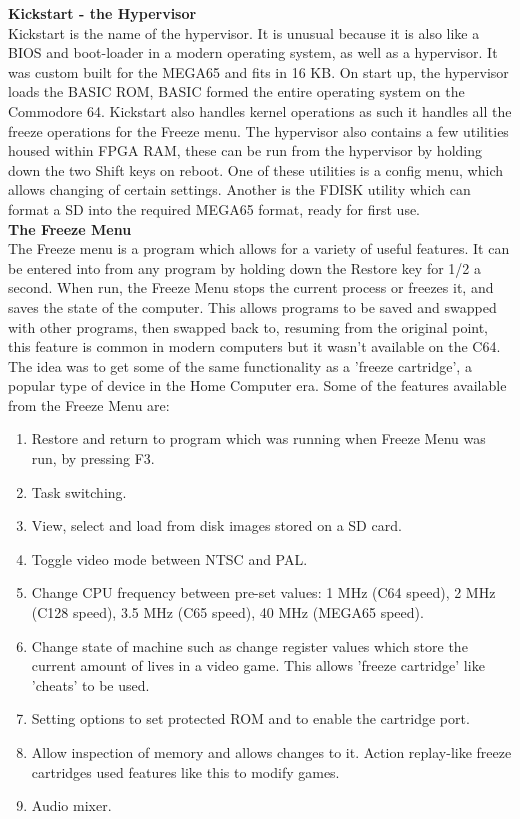 \textbf{Kickstart - the Hypervisor}\\
Kickstart is the name of the hypervisor. It is unusual because it is also like a BIOS and boot-loader in a modern operating system, as well as a hypervisor. It was custom built for the MEGA65 and fits in 16 KB. On start up, the hypervisor loads the BASIC ROM, BASIC formed the entire operating system on the Commodore 64. Kickstart also handles kernel operations as such it handles all the freeze operations for the Freeze menu. The hypervisor also contains a few utilities housed within FPGA RAM, these can be run from the hypervisor by holding down the two Shift keys on reboot. One of these utilities is a config menu, which allows changing of certain settings. Another is the FDISK utility which can format a SD into the required MEGA65 format, ready for first use.\\

\textbf{The Freeze Menu}\\
The Freeze menu is a program which allows for a variety of useful features. It can be entered into from any program by holding down the Restore key for 1/2 a second. When run, the Freeze Menu stops the current process or freezes it, and saves the state of the computer. This allows programs to be saved and swapped with other programs, then swapped back to, resuming from the original point, this feature is common in modern computers but it wasn't available on the C64. The idea was to get some of the same functionality as a 'freeze cartridge', a popular type of device in the Home Computer era. Some of the features available from the Freeze Menu are:
\begin{enumerate}
\item Restore and return to program which was running when Freeze Menu was run, by pressing F3.
\item Task switching.
\item View, select and load from disk images stored on a SD card.
\item Toggle video mode between NTSC and PAL.
\item Change CPU frequency between pre-set values: 1 MHz (C64 speed), 2 MHz (C128 speed), 3.5 MHz (C65 speed), 40 MHz (MEGA65 speed).
\item Change state of machine such as change register values which store the current amount of lives in a video game. This allows 'freeze cartridge' like 'cheats' to be used.
\item Setting options to set protected ROM and to enable the cartridge port.
\item Allow inspection of memory and allows changes to it. Action replay-like freeze cartridges used features like this to modify games.
\item Audio mixer.
\end{enumerate}

